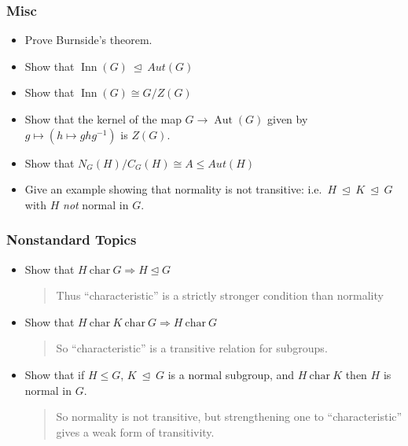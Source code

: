 \hypertarget{misc}{%
\subsubsection{Misc}\label{misc}}

\begin{itemize}
\item
  Prove Burnside's theorem.
\item
  Show that \({\operatorname{Inn}}(G) {~\trianglelefteq~}Aut(G)\)
\item
  Show that \({\operatorname{Inn}}(G) \cong G / Z(G)\)
\item
  Show that the kernel of the map \(G\to \operatorname{Aut}(G)\) given
  by \(g\mapsto (h\mapsto ghg^{-1})\) is \(Z(G)\).
\item
  Show that \(N_G(H) / C_G(H) \cong A \leq Aut(H)\)
\item
  Give an example showing that normality is not transitive:
  i.e.~\(H{~\trianglelefteq~}K {~\trianglelefteq~}G\) with \(H\)
  \emph{not} normal in \(G\).
\end{itemize}

\hypertarget{nonstandard-topics}{%
\subsubsection{Nonstandard Topics}\label{nonstandard-topics}}

\begin{itemize}
\item
  Show that \(H~\text{char}~G \Rightarrow H \unlhd G\)

  \begin{quote}
  Thus ``characteristic'' is a strictly stronger condition than
  normality
  \end{quote}
\item
  Show that
  \(H ~\text{char}~ K ~\text{char}~G \Rightarrow H ~\text{char}~ G\)

  \begin{quote}
  So ``characteristic'' is a transitive relation for subgroups.
  \end{quote}
\item
  Show that if \(H \leq G\), \(K{~\trianglelefteq~}G\) is a normal
  subgroup, and \(H~\text{char}~K\) then \(H\) is normal in \(G\).

  \begin{quote}
  So normality is not transitive, but strengthening one to
  ``characteristic'' gives a weak form of transitivity.
  \end{quote}
\end{itemize}

